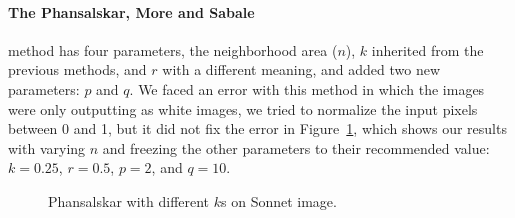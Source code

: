 \documentclass[conference]{IEEEtran}
\begin{document}
\paragraph*{The Phansalskar, More and Sabale} method has four parameters, the neighborhood area ($n$), $k$ inherited from the previous methods, and $r$ with a different meaning, and added two new parameters: $p$ and $q$. We faced an error with this method in which the images were only outputting as white images, we tried to normalize the input pixels between 0 and 1, but it did not fix the error in Figure~\ref{fig:phansalskar_n}, which shows our results with varying $n$ and freezing the other parameters to their recommended value: $k = 0.25$, $r = 0.5$, $p = 2$, and $q = 10$.
\begin{figure}[htbp]
	\centering
	\quad
	\caption{Phansalskar with different $k$s on Sonnet image.}
	\label{fig:phansalskar_n}
\end{figure}
\end{document}
